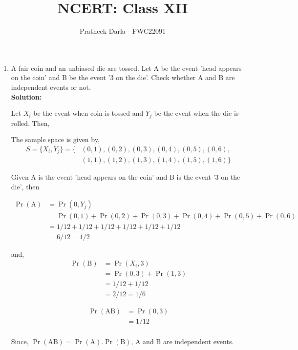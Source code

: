 \documentclass{article}
\providecommand{\pr}[1]{\ensuremath{\Pr\left(#1\right)}}
\newcommand{\solution}{\noindent \textbf{Solution: }}
\begin{document}
\title{NCERT: Class XII}
\author{\Large Pratheek Darla - FWC22091}
\date{}

\maketitle

\begin{enumerate}[label=13.\arabic{enumi}.\arabic{enumii}]%
\setcounter{enumi}{1}
\setcounter{enumii}{4}

\item  A fair coin and an unbiased die are tossed. Let A be the event 'head appears on the coin' and B be the event '3 on the die'. Check whether A and B are independent events or not.\\[1ex]

\solution

Let $X_i$ be the event when coin is tossed and $Y_j$ be the event when the die is rolled. Then,

\begin{table}[h]
	
\end{table}

The sample space is given by, 
\begin{align*}
 S = \{X_i, Y_j \} = \{&(0,1), (0,2), (0,3), (0,4), (0,5), (0,6),\\ 
       &(1,1), (1,2), (1,3), (1,4), (1,5), (1,6) \}
\end{align*}

Given A is the event 'head appears on the coin' and B is the event '3 on the die', then

\begin{align}
\pr{\text{A}} &= \pr{0, Y_j} \\
&= \pr{0,1} + \pr{0,2} + \pr{0,3} + \pr{0,4} +  \pr{0,5} +  \pr{0,6} \\
&= 1/12 + 1/12 + 1/12 + 1/12 + 1/12 + 1/12 \\
&= 6/12 = 1/2
\end{align}

and,
\begin{align}
\pr{\text{B}} &= \pr{X_i, 3} \\
&= \pr{0,3} + \pr{1,3} \\
&= 1/12 + 1/12 \\
&= 2/12 = 1/6
\end{align}

\begin{align}
\pr{\text{AB}} &= \pr{0, 3} \\
&= 1/12 \\
\end{align}

Since, $\pr{\text{AB}} = \pr{\text{A}} . \pr{\text{B}}$, A and B are independent events.

\end{enumerate}
\end{document}
